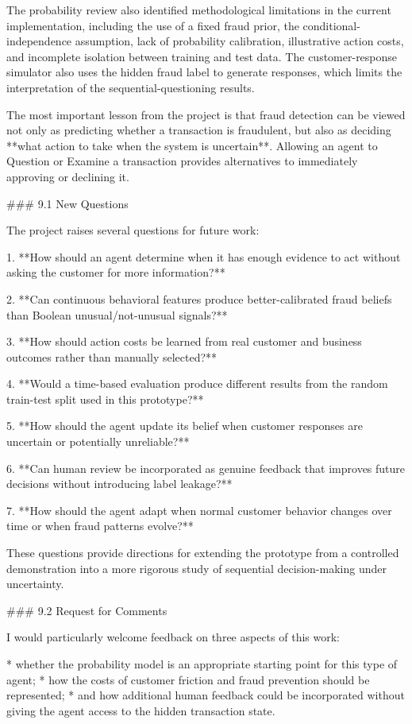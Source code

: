 The probability review also identified methodological limitations in the current implementation, including the use of a fixed fraud prior, the conditional-independence assumption, lack of probability calibration, illustrative action costs, and incomplete isolation between training and test data. The customer-response simulator also uses the hidden fraud label to generate responses, which limits the interpretation of the sequential-questioning results.

The most important lesson from the project is that fraud detection can be viewed not only as predicting whether a transaction is fraudulent, but also as deciding **what action to take when the system is uncertain**. Allowing an agent to Question or Examine a transaction provides alternatives to immediately approving or declining it.

### 9.1 New Questions

The project raises several questions for future work:

1. **How should an agent determine when it has enough evidence to act without asking the customer for more information?**

2. **Can continuous behavioral features produce better-calibrated fraud beliefs than Boolean unusual/not-unusual signals?**

3. **How should action costs be learned from real customer and business outcomes rather than manually selected?**

4. **Would a time-based evaluation produce different results from the random train-test split used in this prototype?**

5. **How should the agent update its belief when customer responses are uncertain or potentially unreliable?**

6. **Can human review be incorporated as genuine feedback that improves future decisions without introducing label leakage?**

7. **How should the agent adapt when normal customer behavior changes over time or when fraud patterns evolve?**

These questions provide directions for extending the prototype from a controlled demonstration into a more rigorous study of sequential decision-making under uncertainty.

### 9.2 Request for Comments

I would particularly welcome feedback on three aspects of this work:

* whether the probability model is an appropriate starting point for this type of agent;
* how the costs of customer friction and fraud prevention should be represented;
* and how additional human feedback could be incorporated without giving the agent access to the hidden transaction state.
